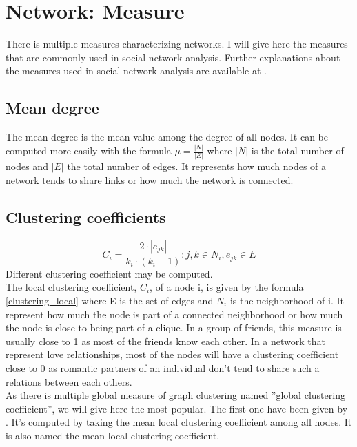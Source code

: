 \documentclass[a4paper, 12pt]{report}
\begin{document}
\section{Network: Measure}
\label{measure}
There is multiple measures characterizing  networks. I will give here the measures that are commonly used in social network analysis. Further explanations about the measures used in social network analysis are available at \cite{SNA_Overview}.

\subsection{Mean degree}
The mean degree is the mean value among the degree of all nodes. It can be computed more easily with the formula $\mu = \frac{|N|}{|E|}$ where $|N|$ is the total number of nodes and $|E|$ the total number of edges. It represents how much nodes of a network tends to share links or  how much the network is connected.

\subsection{Clustering coefficients}
\begin{equation}
C_i = \frac{2 \cdot |e_{jk}|}{k_i \cdot (k_i - 1)}: j, k \in N_i, e_{jk} \in E
\label{clustering_local}
\end{equation}
Different clustering coefficient may be computed.\\
The local clustering coefficient, $C_i$, of a node i, is given by the formula \ref{clustering_local} where E is the set of edges and $N_i$ is the neighborhood of i. It represent how much the node is part of a connected neighborhood or how much the node is close to being part of a clique. In a group of friends, this measure is usually close to 1 as most of the friends know each other. In a network that represent love relationships, most of the nodes will have a clustering coefficient close to 0 as romantic partners of an individual don't tend to share such a relations between each others.\\

As there is multiple global measure of graph clustering named ''global clustering coefficient'', we will give here the most popular. The first one have been given by \cite{globalClustering1}. It's computed by taking the mean local clustering coefficient among all nodes. It is also named the mean local clustering coefficient.  \\
\end{document}
